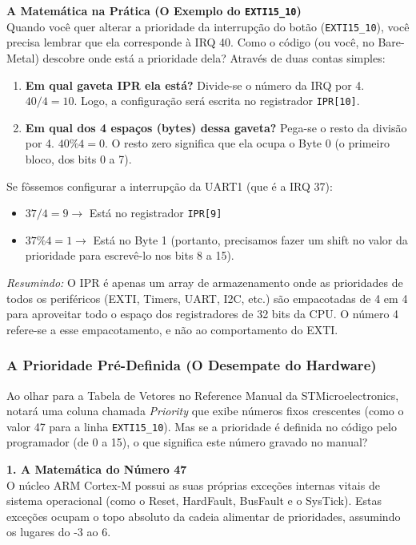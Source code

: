 \documentclass[12pt,a4paper]{article}
\begin{document}
\textbf{A Matemática na Prática (O Exemplo do \texttt{EXTI15\_10})}\\
Quando você quer alterar a prioridade da interrupção do botão (\texttt{EXTI15\_10}), você precisa lembrar que ela corresponde à IRQ 40. Como o código (ou você, no Bare-Metal) descobre onde está a prioridade dela? Através de duas contas simples:
\begin{enumerate}
    \item \textbf{Em qual gaveta IPR ela está?} Divide-se o número da IRQ por 4.
    $40 / 4 = 10$. Logo, a configuração será escrita no registrador \texttt{IPR[10]}.
    \item \textbf{Em qual dos 4 espaços (bytes) dessa gaveta?} Pega-se o resto da divisão por 4.
    $40 \% 4 = 0$. O resto zero significa que ela ocupa o Byte 0 (o primeiro bloco, dos bits 0 a 7).
\end{enumerate}

Se fôssemos configurar a interrupção da UART1 (que é a IRQ 37):
\begin{itemize}
    \item $37 / 4 = 9 \rightarrow$ Está no registrador \texttt{IPR[9]}
    \item $37 \% 4 = 1 \rightarrow$ Está no Byte 1 (portanto, precisamos fazer um shift no valor da prioridade para escrevê-lo nos bits 8 a 15).
\end{itemize}

\textit{Resumindo:} O IPR é apenas um array de armazenamento onde as prioridades de todos os periféricos (EXTI, Timers, UART, I2C, etc.) são empacotadas de 4 em 4 para aproveitar todo o espaço dos registradores de 32 bits da CPU. O número 4 refere-se a esse empacotamento, e não ao comportamento do EXTI.

\subsubsection*{A Prioridade Pré-Definida (O Desempate do Hardware)}
Ao olhar para a Tabela de Vetores no Reference Manual da STMicroelectronics, notará uma coluna chamada \textit{Priority} que exibe números fixos crescentes (como o valor 47 para a linha \texttt{EXTI15\_10}). Mas se a prioridade é definida no código pelo programador (de 0 a 15), o que significa este número gravado no manual?

\textbf{1. A Matemática do Número 47}\\
O núcleo ARM Cortex-M possui as suas próprias exceções internas vitais de sistema operacional (como o Reset, HardFault, BusFault e o SysTick). Estas exceções ocupam o topo absoluto da cadeia alimentar de prioridades, assumindo os lugares do -3 ao 6.
\end{document}
